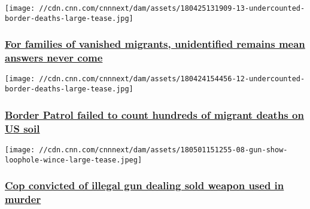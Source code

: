 \href{/2018/05/15/us/us-border-crossing-deaths-invs/index.html}{}

\texttt{[image: //cdn.cnn.com/cnnnext/dam/assets/180425131909-13-undercounted-border-deaths-large-tease.jpg]}

\hypertarget{for-families-of-vanished-migrants-unidentified-remains-mean-answers-never-come}{%
\subsubsection{\texorpdfstring{\href{/2018/05/15/us/us-border-crossing-deaths-invs/index.html}{For
families of vanished migrants, unidentified remains mean answers never
come}}{For families of vanished migrants, unidentified remains mean answers never come}}\label{for-families-of-vanished-migrants-unidentified-remains-mean-answers-never-come}}

\href{/2018/05/14/us/border-patrol-migrant-death-count-invs/index.html}{}

\texttt{[image: //cdn.cnn.com/cnnnext/dam/assets/180424154456-12-undercounted-border-deaths-large-tease.jpg]}

\hypertarget{border-patrol-failed-to-count-hundreds-of-migrant-deaths-on-us-soil}{%
\subsubsection{\texorpdfstring{\href{/2018/05/14/us/border-patrol-migrant-death-count-invs/index.html}{Border
Patrol failed to count hundreds of migrant deaths on US
soil}}{Border Patrol failed to count hundreds of migrant deaths on US soil}}\label{border-patrol-failed-to-count-hundreds-of-migrant-deaths-on-us-soil}}

\href{/2018/05/02/us/dc-cop-unlicensed-gun-dealer/index.html}{}

\texttt{[image: //cdn.cnn.com/cnnnext/dam/assets/180501151255-08-gun-show-loophole-wince-large-tease.jpeg]}

\hypertarget{cop-convicted-of-illegal-gun-dealing-sold-weapon-used-in-murder}{%
\subsubsection{\texorpdfstring{\href{/2018/05/02/us/dc-cop-unlicensed-gun-dealer/index.html}{Cop
convicted of illegal gun dealing sold weapon used in
murder}}{Cop convicted of illegal gun dealing sold weapon used in murder}}\label{cop-convicted-of-illegal-gun-dealing-sold-weapon-used-in-murder}}

